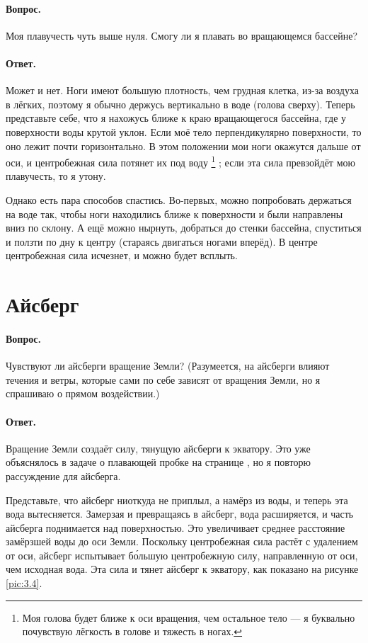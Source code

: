 \paragraph{Вопрос.}
Моя плавучесть чуть выше нуля. Смогу ли я плавать во вращающемся бассейне?

\paragraph{Ответ.}
Может и нет.
Ноги имеют большую плотность, чем грудная клетка, из-за воздуха в лёгких, поэтому я обычно держусь вертикально в воде (голова сверху).
Теперь представьте себе, что я нахожусь ближе к краю вращающегося бассейна, где у поверхности воды крутой уклон.
Если моё тело перпендикулярно поверхности, то оно лежит почти горизонтально.
В этом положении мои ноги окажутся дальше от оси, и центробежная сила потянет их под воду%
\footnote{Моя голова будет ближе к оси вращения, чем остальное тело --- я буквально почувствую лёгкость в голове и тяжесть в ногах.}%
;
если эта сила превзойдёт мою плавучесть, то я утону.

Однако есть пара способов спастись.
Во-первых, можно попробовать держаться на воде так,
чтобы ноги находились ближе к поверхности и были направлены вниз по склону.
А ещё можно нырнуть, добраться до стенки бассейна, спуститься и ползти по дну к центру (стараясь двигаться ногами вперёд).
В центре центробежная сила исчезнет, и можно будет всплыть.

\section{Айсберг}\label{sec:iceberg}

\paragraph{Вопрос.} Чувствуют ли айсберги вращение Земли?
(Разумеется, на айсберги влияют течения и ветры, которые сами по себе зависят от вращения Земли, но я спрашиваю о прямом воздействии.)

\paragraph{Ответ.}
Вращение Земли создаёт силу, тянущую айсберги к экватору.
Это уже объяснялось в задаче о плавающей пробке на странице \pageref{sec:cork},
но я повторю рассуждение для айсберга.

Представьте, что айсберг ниоткуда не приплыл, а намёрз из воды, и теперь эта вода вытесняется.
Замерзая и превращаясь в айсберг, вода расширяется, и часть айсберга поднимается над поверхностью.
Это увеличивает среднее расстояние замёрзшей воды до оси Земли.
Поскольку центробежная сила растёт с удалением от оси, айсберг испытывает б\'{о}льшую центробежную силу, направленную от оси, чем исходная вода.
Эта сила и тянет айсберг к экватору, как показано на рисунке \ref{pic:3.4}.

